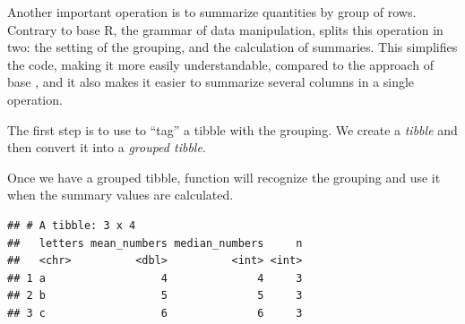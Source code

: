 \documentclass[krantz2]{krantz}\usepackage{knitr}%
\begin{document}
Another important operation is to summarize quantities by group of rows. Contrary to base R, the grammar of data manipulation, splits this operation in two: the setting of the grouping, and the calculation of summaries. This simplifies the code, making it more easily understandable, compared to the approach of base \Rlang {}, and it also makes it easier to summarize several columns in a single operation.

The first step is to use  to ``tag'' a tibble with the grouping. We create a \emph{tibble} and then convert it into a \emph{grouped tibble}.

\begin{knitrout}\footnotesize
{}\color{fgcolor}\begin{kframe}
\begin{alltt}
 \hlkwb{<-} \hlstd{(} \hlstd{=} \hlopt{:}\hlstd{,}  \hlstd{=} \hlstd{(letters[}\hlopt{:}\hlstd{],} \hlstd{))}
 \hlkwb{<-} 
\end{alltt}
\end{kframe}
\end{knitrout}

Once we have a grouped tibble, function  will recognize the grouping and use it when the summary values are calculated.

\begin{knitrout}\footnotesize
{}\color{fgcolor}\begin{kframe}
\begin{alltt}
           \hlstd{=} 
           \hlstd{=} 
           \hlstd{=} \hlstd{())}
\end{alltt}
\begin{verbatim}
## # A tibble: 3 x 4
##   letters mean_numbers median_numbers     n
##   <chr>          <dbl>          <int> <int>
## 1 a                  4              4     3
## 2 b                  5              5     3
## 3 c                  6              6     3
\end{verbatim}
\end{kframe}
\end{knitrout}
\end{document}
